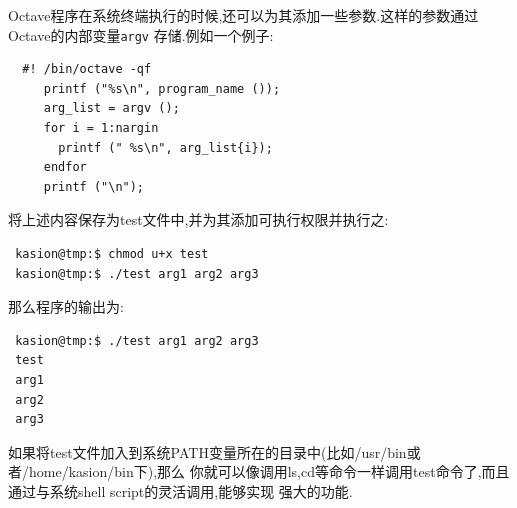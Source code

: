 \documentclass[UTF8,adobefonts]{ctexart}
\begin{document}
Octave程序在系统终端执行的时候,还可以为其添加一些参数.这样的参数通过Octave的内部变量{\tt argv}
存储.例如一个例子:
\begin{verbatim}
  #! /bin/octave -qf
     printf ("%s\n", program_name ());
     arg_list = argv ();
     for i = 1:nargin
       printf (" %s\n", arg_list{i});
     endfor
     printf ("\n");
\end{verbatim}
将上述内容保存为test文件中,并为其添加可执行权限并执行之:
\begin{verbatim}
 kasion@tmp:$ chmod u+x test
 kasion@tmp:$ ./test arg1 arg2 arg3
\end{verbatim}
那么程序的输出为:
\begin{verbatim}
 kasion@tmp:$ ./test arg1 arg2 arg3
 test
 arg1
 arg2
 arg3
\end{verbatim}
如果将test文件加入到系统PATH变量所在的目录中(比如/usr/bin或者/home/kasion/bin下),那么
你就可以像调用ls,cd等命令一样调用test命令了,而且通过与系统shell script的灵活调用,能够实现
强大的功能.
\end{document}
